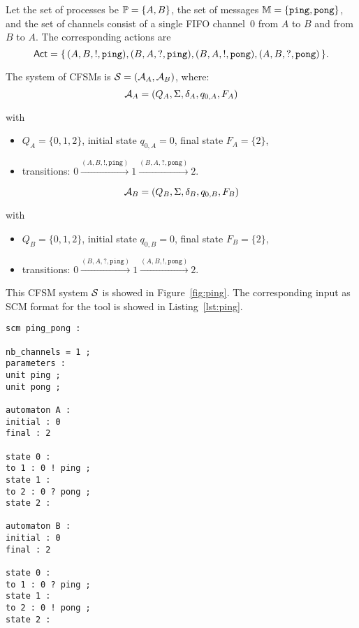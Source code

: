 \begin{example}\label{exm:ping}

Let the set of processes be $\mathbb{P} = \{A,B\}$,
the set of messages $\mathbb{M} = \{\texttt{ping},\texttt{pong}\}$,
and the set of channels consist of a single FIFO channel~0 from 
$A$ to $B$ and from $B$ to $A$. The corresponding actions are
$$
\mathsf{Act} = \{\, (A,B,!,\texttt{ping}), (B,A,?,\texttt{ping}), 
(B,A,!,\texttt{pong}), (A,B,?,\texttt{pong}) \,\}.
$$

The system of CFSMs is $\mathcal{S} = (\mathcal{A}_A, \mathcal{A}_B)$, where:
$$
\mathcal{A}_A = (Q_A, \Sigma, \delta_A, q_{0,A}, F_A)
$$

with
\begin{itemize}
\item $Q_A = \{0,1,2\}$, initial state $q_{0,A} = 0$, final state $F_A = \{2\}$,
\item transitions: $0 \xrightarrow{(A,B,!,\texttt{ping})} 1 \xrightarrow{(B,A,?,\texttt{pong})} 2$.
\end{itemize}

$$
\mathcal{A}_B = (Q_B, \Sigma, \delta_B, q_{0,B}, F_B)
$$

with
\begin{itemize}
\item $Q_B = \{0,1,2\}$, initial state $q_{0,B} = 0$, final state $F_B = \{2\}$,
\item transitions: $0 \xrightarrow{(B,A,?,\texttt{ping})} 1 \xrightarrow{(A,B,!,\texttt{pong})} 2$.
\end{itemize}

This CFSM system $\mathcal{S}$ is showed in Figure~\ref{fig:ping}. The corresponding
input as SCM format for the tool is showed in Listing~\ref{lst:ping}.

\bigskip

\begin{lstlisting}[language={},caption={Tool's input for Example~\ref{exm:ping}},label={lst:ping}]
scm ping_pong :

nb_channels = 1 ;
parameters :
unit ping ;
unit pong ;

automaton A :
initial : 0
final : 2

state 0 :
to 1 : 0 ! ping ;
state 1 :
to 2 : 0 ? pong ;
state 2 :

automaton B :
initial : 0
final : 2

state 0 :
to 1 : 0 ? ping ;
state 1 :
to 2 : 0 ! pong ;
state 2 :
\end{lstlisting}
  

\end{example}

